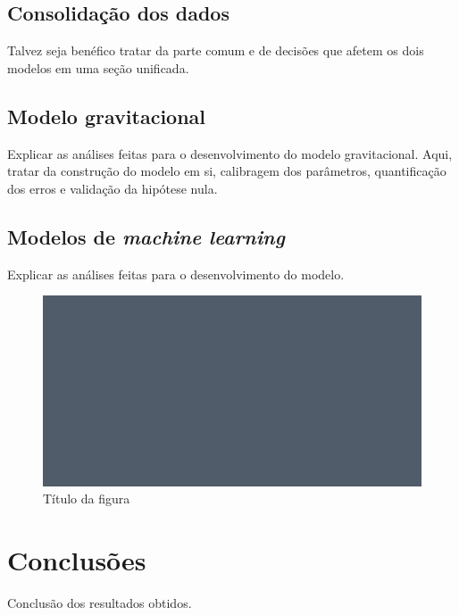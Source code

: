 \documentclass[12pt]{article}
\begin{document}
\hypertarget{consolidauxe7uxe3o-dos-dados}{%
\subsection{Consolidação dos dados}\label{consolidauxe7uxe3o-dos-dados}}

Talvez seja benéfico tratar da parte comum e de decisões que afetem os
dois modelos em uma seção unificada.

\hypertarget{modelo-gravitacional-1}{%
\subsection{Modelo gravitacional}\label{modelo-gravitacional-1}}

Explicar as análises feitas para o desenvolvimento do modelo
gravitacional. Aqui, tratar da construção do modelo em si, calibragem
dos parâmetros, quantificação dos erros e validação da hipótese nula.

\hypertarget{modelos-de-machine-learning-1}{%
\subsection{\texorpdfstring{Modelos de \emph{machine
learning}}{Modelos de machine learning}}\label{modelos-de-machine-learning-1}}

Explicar as análises feitas para o desenvolvimento do modelo.

\begin{figure}[H]

{\centering \includegraphics[width=1\linewidth]{../figures/sample_figure_1} 

}

\caption{Título da figura}\label{fig:figuraExemplo}
\end{figure}

\hypertarget{conclusuxf5es}{%
\section{Conclusões}\label{conclusuxf5es}}

Conclusão dos resultados obtidos.



\end{document}
